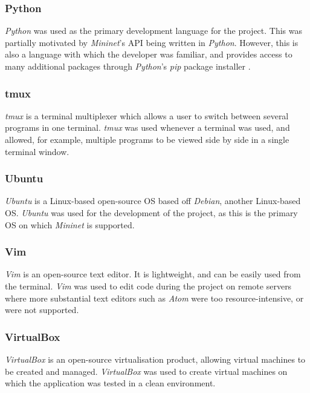 \subsubsection{Python \cite{python}}
\textit{Python} was used as the primary development language for the project. This was partially motivated by \textit{Mininet}'s API being written in \textit{Python}. However, this is also a language with which the developer was familiar, and provides access to many additional packages through \textit{Python}'s \textit{pip} package installer \cite{pip}.

\subsubsection{tmux \cite{tmux}}
\textit{tmux} is a terminal multiplexer which allows a user to switch between several programs in one terminal. \textit{tmux} was used whenever a terminal was used, and allowed, for example, multiple programs to be viewed side by side in a single terminal window.

\subsubsection{Ubuntu \cite{ubuntu}}
\textit{Ubuntu} is a Linux-based open-source OS based off \textit{Debian}, another Linux-based OS. \textit{Ubuntu} was used for the development of the project, as this is the primary OS on which \textit{Mininet} is supported.

\subsubsection{Vim \cite{vim}}
\textit{Vim} is an open-source text editor. It is lightweight, and can be easily used from the terminal. \textit{Vim} was used to edit code during the project on remote servers where more substantial text editors such as \textit{Atom} were too resource-intensive, or were not supported.

\subsubsection{VirtualBox \cite{virtualbox}}
\textit{VirtualBox} is an open-source virtualisation product, allowing virtual machines to be created and managed. \textit{VirtualBox} was used to create virtual machines on which the application was tested in a clean environment.

